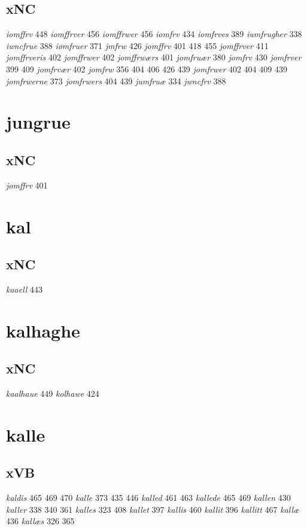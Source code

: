 \documentclass[a4paper,twocolumn]{article}
\begin{document}
\subsection{xNC}
\label{sec:org6ebda53}
\emph{iomffrv} 448 \emph{iomffrver} 456 \emph{iomffrwer} 456 \emph{iomfrv} 434 \emph{iomfrves} 389 \emph{iumfrugher} 338 \emph{iwncfrue} 388 \emph{iømfruer} 371 \emph{jmfrw} 426 \emph{jomffrv} 401 418 455 \emph{jomffrver} 411 \emph{jomffrveris} 402 \emph{jomffrwer} 402 \emph{jomffrwærs} 401 \emph{jomfruær} 380 \emph{jomfrv} 430 \emph{jomfrver} 399 409 \emph{jomfrvær} 402 \emph{jomfrw} 356 404 406 426 439 \emph{jomfrwer} 402 404 409 439 \emph{jomfrwerne} 373 \emph{jomfrwers} 404 439 \emph{jumfruæ} 334 \emph{jwncfrv} 388 
\section{jungrue}
\label{sec:orgaebf7c9}
\subsection{xNC}
\label{sec:org77d30db}
\emph{jomffrv} 401 
\section{kal}
\label{sec:orge262458}
\subsection{xNC}
\label{sec:org5b520cc}
\emph{kaaell} 443 
\section{kalhaghe}
\label{sec:org54365aa}
\subsection{xNC}
\label{sec:org5bee3b0}
\emph{kaalhaue} 449 \emph{kolhawe} 424 
\section{kalle}
\label{sec:orge66adc3}
\subsection{xVB}
\label{sec:orge95a959}
\emph{kaldis} 465 469 470 \emph{kalle} 373 435 446 \emph{kalled} 461 463 \emph{kallede} 465 469 \emph{kallen} 430 \emph{kaller} 338 340 361 \emph{kalles} 323 408 \emph{kallet} 397 \emph{kallis} 460 \emph{kallit} 396 \emph{kallitt} 467 \emph{kallæ} 436 \emph{kallæs} 326 365 
\end{document}
